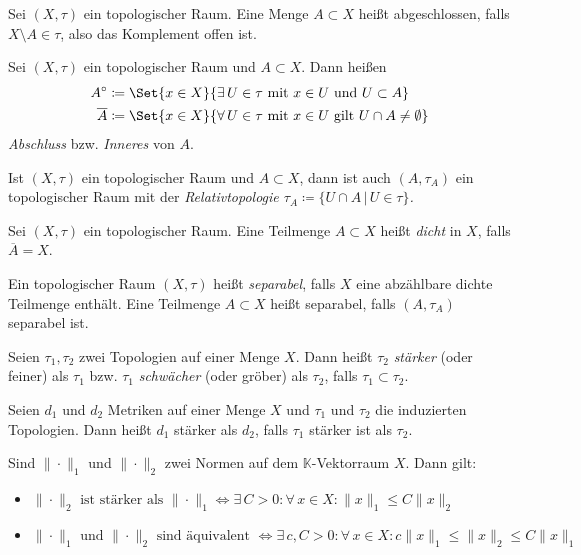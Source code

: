 \documentclass{cheat-sheet}
\newcommand{\K}{\mathbb{K}}
\begin{document}
\begin{defn}
  Sei $(X, \tau)$ ein topologischer Raum. Eine Menge $A \subset X$ heißt abgeschlossen, falls $X \setminus A \in \tau$, also das Komplement offen ist.
\end{defn}

\begin{defn}
  Sei $(X, \tau)$ ein topologischer Raum und $A \subset X$. Dann heißen
  \begin{align*}
    A^{\circ} &\coloneqq \Set{ x \in X }{ \exists\,U \in \tau \text{ mit } x \in U \text{ und } U \subset A } \\
    \overline{A} &\coloneqq \Set{ x \in X }{ \forall\,U \in \tau \text{ mit } x \in U \text{ gilt } U \cap A \not= \emptyset }
  \end{align*}
  \emph{Abschluss} bzw. \emph{Inneres} von $A$.
\end{defn}

\begin{defn}
  Ist $(X, \tau)$ ein topologischer Raum und $A \subset X$, dann ist auch $(A, \tau_A)$ ein topologischer Raum mit der \em{Relativtopologie} $\tau_A \coloneqq \{ U \cap A \,|\,U \in \tau \}$.
\end{defn}

\begin{defn}
  Sei $(X, \tau)$ ein topologischer Raum. Eine Teilmenge $A \subset X$ heißt \emph{dicht} in $X$, falls $\overline{A} = X$.
\end{defn}

\begin{defn}
  Ein topologischer Raum $(X, \tau)$ heißt \emph{separabel}, falls $X$ eine abzählbare dichte Teilmenge enthält. Eine Teilmenge $A \subset X$ heißt separabel, falls $(A, \tau_A)$ separabel ist.
\end{defn}

\begin{defn}
  Seien $\tau_1, \tau_2$ zwei Topologien auf einer Menge $X$. Dann heißt $\tau_2$ \emph{stärker} (oder feiner) als $\tau_1$ bzw. $\tau_1$ \emph{schwächer} (oder gröber) als $\tau_2$, falls $\tau_1 \subset \tau_2$.
\end{defn}

\begin{defn}
  Seien $d_1$ und $d_2$ Metriken auf einer Menge $X$ und $\tau_1$ und $\tau_2$ die induzierten Topologien. Dann heißt $d_1$ stärker als $d_2$, falls $\tau_1$ stärker ist als $\tau_2$.
\end{defn}

\begin{satz}
  Sind $\| \cdot \|_1$ und $\| \cdot \|_2$ zwei Normen auf dem $\K$-Vektorraum $X$. Dann gilt:
  \begin{itemize}
    \item $\| \cdot \|_2 \text{ ist stärker als } \| \cdot \|_1 \iff \exists\,C > 0 : \forall\,x \in X : \| x \|_1 \leq C \| x \|_2$
    \item $\| \cdot \|_1 \text{ und } \| \cdot \|_2 \text{ sind äquivalent } \iff \exists\,c, C > 0 : \forall\,x \in X : c \| x \|_1 \leq \| x \|_2 \leq C \| x \|_1$
  \end{itemize}
\end{satz}
\end{document}
